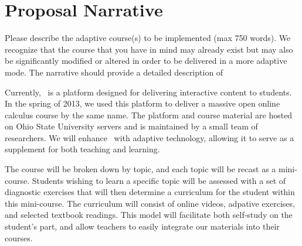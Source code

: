 \section{Proposal Narrative}


\begin{question}
Please describe the adaptive course(s) to be implemented (max 750
words). We recognize that the course that you have in mind may
already exist but may also be significantly modified or altered in
order to be delivered in a more adaptive mode. The narrative should
provide a detailed description of 
\end{question}
%
%
%
%
%
%
%




Currently, \mooculus\ is a platform designed for delivering interactive
content to students. In the spring of 2013, we used this platform to
deliver a massive open online calculus course by the same name. The
platform and course material are hosted on Ohio State University
servers and is maintained by a small team of researchers. We will
enhance \mooculus\ with adaptive technology, allowing it to serve as a
supplement for both teaching and learning.


The course will be broken down by topic, and each topic will be recast
as a mini-course. Students wishing to learn a specific topic will be
assessed with a set of diagnostic exercises that will then determine a
curriculum for the student within this mini-course. The curriculum
will consist of online videos, adpative exercises, and selected
textbook readings. This model will facilitate both self-study on the
student's part, and allow teachers to easily integrate our materials
into their courses.

